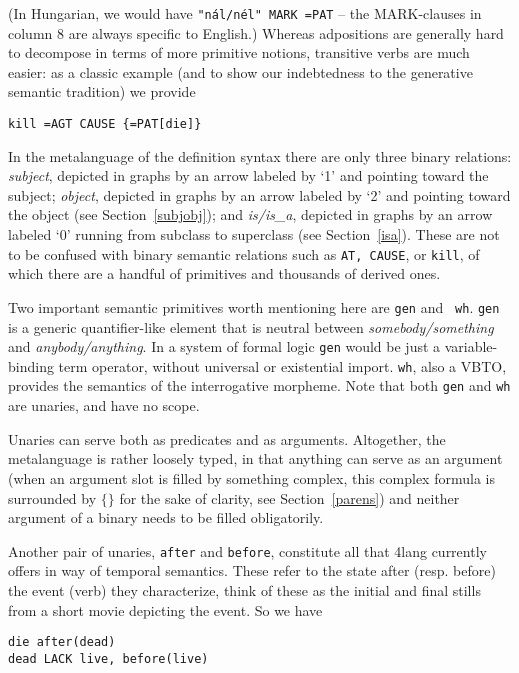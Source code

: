 \documentclass[11pt,bookmarks,bookmarksnumbered,naturalnames,plainpages=false,pdftex,colorlinks=true,urlcolor=blue,bookmarksdepth=subsection,plainpages=false]{paper}
\begin{document}
\noindent
(In Hungarian, we would have {\tt "n\'al/n\'el" MARK =PAT} -- the MARK-clauses
in column 8 are always specific to English.) Whereas adpositions are generally
hard to decompose in terms of more primitive notions, transitive verbs are
much easier: as a classic example (and to show our indebtedness to the
generative semantic tradition) we provide

\begin{verbatim}
kill =AGT CAUSE {=PAT[die]} 
\end{verbatim}

\noindent
In the metalanguage of the definition syntax there are only three binary
relations: {\it subject}, depicted in graphs by an arrow labeled by `1' and
pointing toward the subject; {\it object}, depicted in graphs by an arrow
labeled by `2' and pointing toward the object (see Section~\ref{subjobj}); and
{\it is/is\_a}, depicted in graphs by an arrow labeled `0' running from
subclass to superclass (see Section~\ref{isa}). These are not to be confused
with binary semantic relations such as {\tt AT, CAUSE}, or {\tt kill}, of which
there are a handful of primitives and thousands of derived ones.

Two important semantic primitives worth mentioning here are {\tt gen} and {\tt
  wh}.  {\tt gen} is a generic quantifier-like element that is neutral between
{\it somebody/something} and {\it anybody/anything}. In a system of formal
logic {\tt gen} would be just a variable-binding term operator, without
universal or existential import.  {\tt wh}, also a VBTO, provides the
semantics of the interrogative morpheme. Note that both {\tt gen} and {\tt wh}
are unaries, and have no scope. 

Unaries can serve both as predicates and as arguments.  Altogether, the
metalanguage is rather loosely typed, in that anything can serve as an
argument (when an argument slot is filled by something complex, this complex
formula is surrounded by $\{ \}$ for the sake of clarity, see
Section~\ref{parens}) and neither argument of a binary needs to be filled
obligatorily. 

Another pair of unaries, {\tt after} and {\tt before}, constitute all that
4lang currently offers in way of temporal semantics. These refer to the state 
after (resp. before) the event (verb) they characterize, think of these as
the initial and final stills from a short movie depicting the event. So we have 

\begin{verbatim}
die after(dead)
dead LACK live, before(live)
\end{verbatim}
\end{document}
